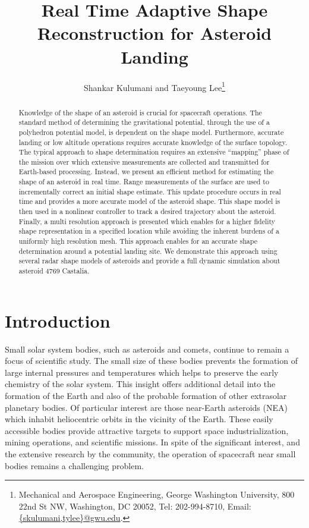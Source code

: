 \documentclass[letterpaper, paper,11pt]{AAS}		%
\begin{document}
\title{Real Time Adaptive Shape Reconstruction for Asteroid Landing}

\author{Shankar Kulumani and Taeyoung Lee\thanks{Mechanical and Aerospace Engineering, George Washington University, 800 22nd St NW, Washington, DC 20052, Tel: 202-994-8710, Email: \href{mailto:skulumani@gwu.edu}{\{skulumani,tylee\}@gwu.edu}.}
}


\maketitle{} 		

\begin{abstract}
    Knowledge of the shape of an asteroid is crucial for spacecraft operations.
    The standard method of determining the gravitational potential, through the use of a polyhedron potential model, is dependent on the shape model.
    Furthermore, accurate landing or low altitude operations requires accurate knowledge of the surface topology. 
    The typical approach to shape determination requires an extensive ``mapping'' phase of the mission over which extensive measurements are collected and transmitted for Earth-based processing.
    Instead, we present an efficient method for estimating the shape of an asteroid in real time.
    Range measurements of the surface are used to incrementally correct an initial shape estimate.
    This update procedure occurs in real time and provides a more accurate model of the asteroid shape.
    This shape model is then used in a nonlinear controller to track a desired trajectory about the asteroid.
    Finally, a multi resolution approach is presented which enables for a higher fidelity shape representation in a specified location while avoiding the inherent burdens of a uniformly high resolution mesh. 
    This approach enables for an accurate shape determination around a potential landing site.
    We demonstrate this approach using several radar shape models of asteroids and provide a full dynamic simulation about asteroid 4769 Castalia.
\end{abstract}

\section{Introduction}\label{sec:introduction}
Small solar system bodies, such as asteroids and comets, continue to remain a focus of scientific study.
The small size of these bodies prevents the formation of large internal pressures and temperatures which helps to preserve the early chemistry of the solar system.
This insight offers additional detail into the formation of the Earth and also of the probable formation of other extrasolar planetary bodies.
Of particular interest are those near-Earth asteroids (NEA) which inhabit heliocentric orbits in the vicinity of the Earth. 
These easily accessible bodies provide attractive targets to support space industrialization, mining operations, and scientific missions.
In spite of the significant interest, and the extensive research by the community, the operation of spacecraft near small bodies remains a challenging problem.
\end{document}
